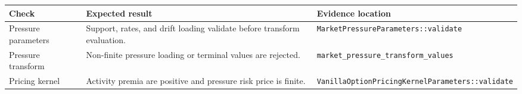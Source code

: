 \documentclass[11pt]{article}
\begin{document}
\begin{tabularx}{\textwidth}{XXX}
\toprule
Check & Expected result & Evidence location\\
\midrule
Pressure parameters
& Support, rates, and drift loading validate before transform evaluation.
& \texttt{MarketPressureParameters::validate}\\
Pressure transform
& Non-finite pressure loading or terminal values are rejected.
& \texttt{market\_pressure\_transform\_values}\\
Pricing kernel
& Activity premia are positive and pressure risk price is finite.
& \texttt{VanillaOptionPricingKernelParameters::validate}\\
\bottomrule
\end{tabularx}
\end{document}
